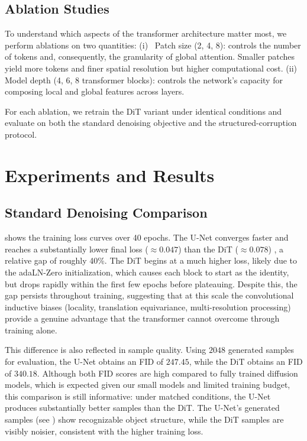 \documentclass{article}
\begin{document}
\subsection{Ablation Studies}

To understand which aspects of the transformer architecture matter most, we perform ablations on two quantities: (i)~ Patch size (2, 4, 8): controls the number of tokens and, consequently, the granularity of global attention. Smaller patches yield more tokens and finer spatial resolution but higher computational cost. (ii)~ Model depth (4, 6, 8 transformer blocks): controls the network's capacity for composing local and global features across layers.

For each ablation, we retrain the DiT variant under identical conditions and evaluate on both the standard denoising objective and the structured-corruption protocol.

\section{Experiments and Results}
\label{sec:experiments}

\subsection{Standard Denoising Comparison}

 shows the training loss curves over 40 epochs.
The U-Net converges faster and reaches a substantially lower final loss ($\approx 0.047$) than the DiT ($\approx 0.078$)
, a relative gap of roughly 40\%.
The DiT begins at a much higher loss, likely due to the adaLN-Zero initialization, which causes each block to start as the identity, but drops rapidly within the first few epochs before plateauing.
Despite this, the gap persists throughout training, suggesting that at this scale the convolutional inductive biases (locality, translation equivariance, multi-resolution processing) provide a genuine advantage that the transformer cannot overcome through training alone.

This difference is also reflected in sample quality. Using $2048$ generated samples for evaluation, the U-Net obtains an FID of $247.45$, while the DiT obtains an FID of $340.18$.
Although both FID scores are high compared to fully trained diffusion models, which is expected given our small models and limited training budget, this comparison is still informative: under matched conditions, the U-Net produces substantially better samples than the DiT.
The U-Net's generated samples (see ) show recognizable object structure, while the DiT samples are visibly noisier, consistent with the higher training loss.
\end{document}
